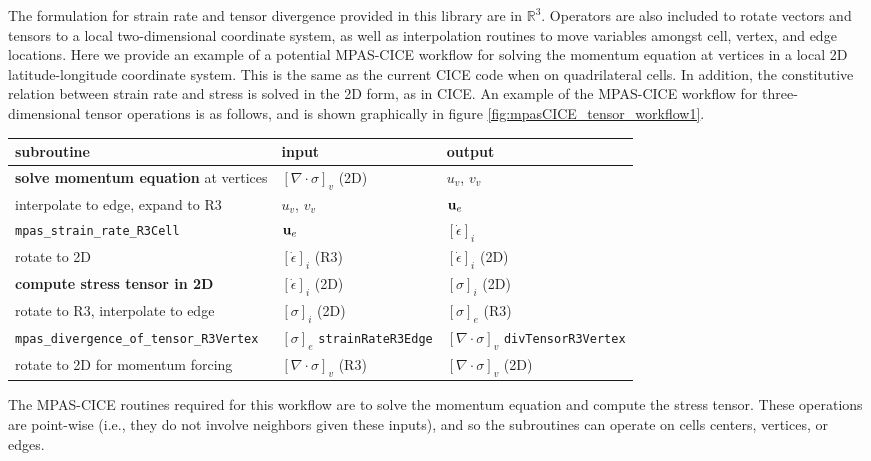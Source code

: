 \documentclass[11pt]{report}
\begin{document}
The formulation for strain rate and tensor divergence provided in this library are in $\mathbb{R}^3$.  Operators are also included to rotate vectors and tensors to a local two-dimensional coordinate system, as well as interpolation routines to move variables amongst cell, vertex, and edge locations.  Here we provide an example of a potential MPAS-CICE workflow for solving the momentum equation at vertices in a local 2D latitude-longitude coordinate system.  This is the same as the current CICE code when on quadrilateral cells.  In addition, the constitutive relation between strain rate and stress is solved in the 2D form, as in CICE.  An example of the MPAS-CICE workflow for three-dimensional tensor operations is as follows, and is shown graphically in figure \ref{fig:mpasCICE_tensor_workflow1}.  
\begin{tabular}{ |l| l| l| }
\hline
  {\bf subroutine} &  {\bf input} &  {\bf output} \\
\hline
{\bf solve momentum equation} at vertices &$[\nabla \cdot \sigma]_v$ (2D) & $u_v$, $v_v$\\
interpolate to edge, expand to R3 & $u_v$, $v_v$ & ${\bf u}_e$ \\
\verb|mpas_strain_rate_R3Cell|   & ${\bf u}_e$ & $\left[\dot\epsilon  \right]_i$ \\
rotate to 2D &  $\left[\dot\epsilon  \right]_i$ (R3) &  $\left[\dot\epsilon  \right]_i$ (2D)\\
{\bf compute stress tensor in 2D} &  $\left[\dot\epsilon  \right]_i$ (2D) &  $\left[\sigma  \right]_i$ (2D)\\
rotate to R3, interpolate to edge  & $\left[\sigma  \right]_i$ (2D) &  $\left[\sigma  \right]_e$ (R3) \\
\verb|mpas_divergence_of_tensor_R3Vertex|   &  $\left[\sigma  \right]_e$ \verb|strainRateR3Edge|& $[\nabla \cdot \sigma]_v$ \verb|divTensorR3Vertex|\\
rotate to 2D for momentum forcing &  $[\nabla \cdot \sigma]_v$ (R3) & $[\nabla \cdot \sigma]_v$ (2D) \\
\hline
\end{tabular}
\vspace{8pt}

The MPAS-CICE routines required for this workflow are to solve the momentum equation and compute the stress tensor.  These operations are point-wise (i.e., they do not involve neighbors given these inputs), and so the subroutines can operate on cells centers, vertices, or edges.  
\end{document}
